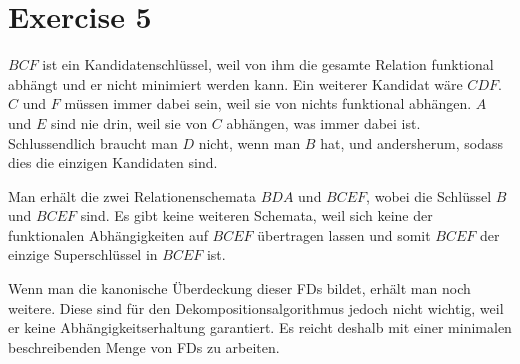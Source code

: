 \documentclass[10pt,a4paper]{article}
\begin{document}
\section*{Exercise 5}

$BCF$ ist ein Kandidatenschlüssel, weil von ihm die gesamte Relation funktional abhängt und er nicht minimiert werden kann.
Ein weiterer Kandidat wäre $CDF$.
$C$ und $F$ müssen immer dabei sein, weil sie von nichts funktional abhängen.
$A$ und $E$ sind nie drin, weil sie von $C$ abhängen, was immer dabei ist.
Schlussendlich braucht man $D$ nicht, wenn man $B$ hat, und andersherum, sodass dies die einzigen Kandidaten sind.

Man erhält die zwei Relationenschemata $BDA$ und $BCEF$, wobei die Schlüssel $B$ und $BCEF$ sind.
Es gibt keine weiteren Schemata, weil sich keine der funktionalen Abhängigkeiten auf $BCEF$ übertragen lassen und somit $BCEF$ der einzige Superschlüssel in $BCEF$ ist.

Wenn man die kanonische Überdeckung dieser FDs bildet, erhält man noch weitere.
Diese sind für den Dekompositionsalgorithmus jedoch nicht wichtig, weil er keine Abhängigkeitserhaltung garantiert.
Es reicht deshalb mit einer minimalen beschreibenden Menge von FDs zu arbeiten.
\end{document}
